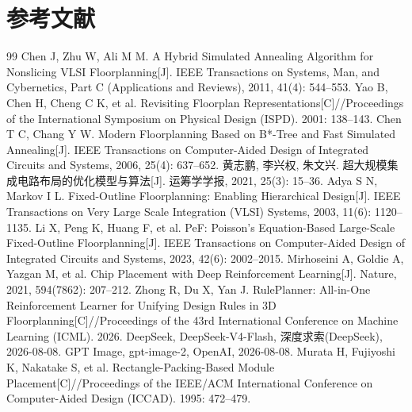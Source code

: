 \documentclass{JXUSTmodeling}
\begin{document}
\section{参考文献}\label{sec:ref}
\begin{thebibliography}{99}
Chen J, Zhu W, Ali M M. A Hybrid Simulated Annealing Algorithm for Nonslicing VLSI Floorplanning[J]. IEEE Transactions on Systems, Man, and Cybernetics, Part C (Applications and Reviews), 2011, 41(4): 544--553.
Yao B, Chen H, Cheng C K, et al. Revisiting Floorplan Representations[C]//Proceedings of the International Symposium on Physical Design (ISPD). 2001: 138--143.
Chen T C, Chang Y W. Modern Floorplanning Based on B*-Tree and Fast Simulated Annealing[J]. IEEE Transactions on Computer-Aided Design of Integrated Circuits and Systems, 2006, 25(4): 637--652.
黄志鹏, 李兴权, 朱文兴. 超大规模集成电路布局的优化模型与算法[J]. 运筹学学报, 2021, 25(3): 15--36.
Adya S N, Markov I L. Fixed-Outline Floorplanning: Enabling Hierarchical Design[J]. IEEE Transactions on Very Large Scale Integration (VLSI) Systems, 2003, 11(6): 1120--1135.
Li X, Peng K, Huang F, et al. PeF: Poisson's Equation-Based Large-Scale Fixed-Outline Floorplanning[J]. IEEE Transactions on Computer-Aided Design of Integrated Circuits and Systems, 2023, 42(6): 2002--2015.
Mirhoseini A, Goldie A, Yazgan M, et al. Chip Placement with Deep Reinforcement Learning[J]. Nature, 2021, 594(7862): 207--212.
Zhong R, Du X, Yan J. RulePlanner: All-in-One Reinforcement Learner for Unifying Design Rules in 3D Floorplanning[C]//Proceedings of the 43rd International Conference on Machine Learning (ICML). 2026.
DeepSeek, DeepSeek-V4-Flash, 深度求索(DeepSeek), 2026-08-08.
GPT Image, gpt-image-2, OpenAI, 2026-08-08.
Murata H, Fujiyoshi K, Nakatake S, et al. Rectangle-Packing-Based Module Placement[C]//Proceedings of the IEEE/ACM International Conference on Computer-Aided Design (ICCAD). 1995: 472--479.
\end{thebibliography}
\end{document}
